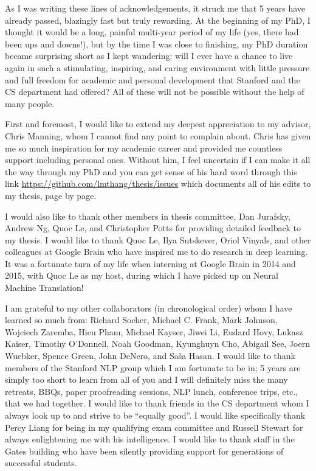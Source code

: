 As I was writing these lines of acknowledgements, it struck me that 5 years have already passed, blazingly fast but truly rewarding. 
At the beginning of my PhD, I thought it would be a long, painful multi-year period of my life (yes, there had been ups and downs!), but by the time I was close to finishing, my PhD duration became surprising short as I kept wandering: will I ever have a chance to live again in such a stimulating, inspiring, and caring environment with little pressure and full freedom for academic and personal development that Stanford and the CS department had offered? All of these will not be possible without the help of many people.

First and foremost, I would like to extend my deepest appreciation to my advisor, Chris Manning, whom I cannot find any point to complain about. Chris has given me so much inspiration for my academic career and provided me countless support including personal ones. Without him, I feel uncertain if I can make it all the way through my PhD and you can get sense of his hard word through this link \url{https://github.com/lmthang/thesis/issues} which documents all of his edits to my thesis, page by page.

I would also like to thank other members in thesis committee, Dan Jurafsky, Andrew Ng, Quoc Le, and Christopher Potts for providing detailed feedback to my thesis.
I would like to thank Quoc Le, Ilya Sutskever, Oriol Vinyals, and other colleagues at Google Brain who have inspired me to do research in deep learning. It was a fortunate turn of my life when interning at Google Brain in 2014 and 2015, with Quoc Le as my host, during which I have picked up on Neural Machine Translation!

I am grateful to my other collaborators (in chronological order) whom I have learned so much from: Richard Socher, Michael C. Frank, Mark Johnson, Wojciech Zaremba, Hieu Pham, Michael Kayser, Jiwei Li, Eudard Hovy, Lukasz Kaiser, Timothy O'Donnell, Noah Goodman, Kyunghuyn Cho, Abigail See, Joern Wuebker, Spence Green, John DeNero, and Sa\v{s}a Hasan. I would like to thank members of the Stanford NLP group which I am fortunate to be in; 5 years are simply too short to learn from all of you and I will definitely miss the many retreats, BBQs, paper proofreading sessions, NLP lunch, conference trips, etc., that we had together. I would like to thank friends in the CS department whom I always look up to and strive to be ``equally good''. I would like specifically thank Percy Liang for being in my qualifying exam committee and Russell Stewart for always enlightening me with his intelligence. I would like to thank staff in the Gates building who have been silently providing support for generations of successful students.

